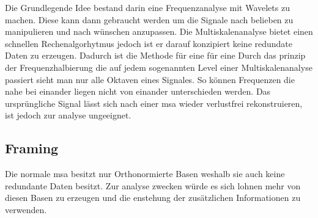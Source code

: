 



Die Grundlegende Idee bestand darin eine Frequenzanalyse mit Wavelets zu machen. Diese kann dann gebraucht werden um die Signale nach belieben zu manipulieren und nach wünschen anzupassen. Die Multiskalenanalyse bietet einen schnellen Rechenalgorhytmus jedoch ist er darauf konzipiert keine redundate Daten zu erzeugen. Dadurch ist die Methode für eine für eine  Durch das prinzip der Frequenzhalbierung die auf jedem sogenannten Level einer Multiskalenanalyse passiert sieht man nur alle Oktaven eines Signales. So können Frequenzen die nahe bei einander liegen nicht von einander unterschieden werden. Das ursprüngliche Signal lässt sich nach einer msa wieder verlustfrei rekonstruieren, ist jedoch zur analyse ungeeignet.\\



\subsection{Framing}
Die normale msa besitzt nur Orthonormierte Basen weshalb sie auch keine redundante Daten besitzt. Zur analyse zwecken würde es sich lohnen mehr von diesen Basen zu erzeugen und die enstehung der zusätzlichen Informationen zu verwenden. 


